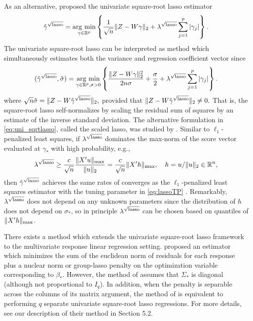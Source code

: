\documentclass[12pt]{article}
\newcommand{\argmin}{\operatorname*{arg \ min}}
\begin{document}
As an alternative, \citet{belloni2011square} proposed the univariate square-root lasso estimator
$$\hat{\gamma}^{\sqrt{\rm lasso}} = \argmin_{\gamma \in \mathbb{R}^p} 
\left\{ \frac{1}{\sqrt{n}} \|Z - W\gamma\|_2 + \lambda^{\sqrt{\rm lasso}} \sum_{j=1}^p |\gamma_j| \right\}.$$
The univariate square-root lasso can be interpreted as method which simultaneously estimates both the variance and regression coefficient vector since 
\begin{equation} 
(\hat{\gamma}^{\sqrt{\rm lasso}}, \hat{\sigma}) = \argmin_{\gamma \in \mathbb{R}^p, \sigma > 0} 
\left\{
 \frac{\|Z - W\gamma\|^2_2}{2 n \sigma} + \frac{\sigma}{2} +  \lambda^{\sqrt{\rm lasso}} \sum_{j=1}^p |\gamma_j| \right\}. \label{eq:uni_sqrtlasso}
\end{equation}
where $\sqrt{n} \hat{\sigma} = \|Z - W \hat{\gamma}^{\sqrt{\rm lasso}}\|_2,$ provided that $\|Z - W \hat{\gamma}^{\sqrt{\rm lasso}}\|_2 \neq 0.$ That is, the square-root lasso self-normalizes by scaling the residual sum of squares by an estimate of the inverse standard deviation. The alternative formulation in \eqref{eq:uni_sqrtlasso}, called the scaled lasso, was studied by \citet{sun2012scaled}. 
Similar to $\ell_1$-penalized least squares, if $\lambda^{\sqrt{\rm lasso}}$ dominates the max-norm of the score vector evaluated at $\gamma_*$ with high probability, e.g., 
\begin{equation} \label{eq:sqrtlassoTP}
\lambda^{\sqrt{\rm lasso}} \geq \frac{c}{\sqrt{n}}\frac{\|X'u\|_{\rm max}}{\|u\|_2} = \frac{c}{\sqrt{n}}\|X'h\|_{\rm max}, \quad h = u/\|u\|_2 \in \mathbb{R}^{n},
\end{equation}
then $\hat{\gamma}^{\sqrt{\rm lasso}}$ achieves the same rates of converges as the $\ell_1$-penalized least squares estimator with the tuning parameter in \eqref{eq:lassoTP} \citep{belloni2011square}. Remarkably, $\lambda^{\sqrt{\rm lasso}}$ does not depend on any unknown parameters since the distribution of $h$ does not depend on $\sigma_*$, so in principle $\lambda^{\sqrt{\rm lasso}}$ can be chosen based on quantiles of $\|X'h\|_{\rm max}$. 

There exists a method which extends the univariate square-root lasso framework to the multivariate response linear regression setting. \citet{liu2015calibrated} proposed an estimator which minimizes the sum of the euclidean norm of residuals for each response plus a nuclear norm or group-lasso penalty on the optimization variable corresponding to $\beta_*$. However, the method of \citet{liu2015calibrated} assumes that $\Sigma_*$ is diagonal (although not proportional to $I_q$). In addition, when the penalty is separable across the columns of its matrix argument, the method of \citet{liu2015calibrated} is equivalent to performing $q$ separate univariate square-root lasso regressions. For more details, see our description of their method in Section 5.2.
\end{document}
